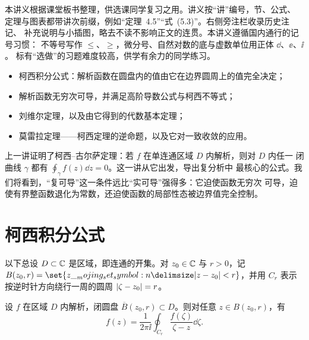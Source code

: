 \documentclass{mojing-notes}
\institute{示例大学数学科学学院}
\begin{document}
\maketitle
\tableofcontents

\vspace{2\baselineskip}
\par\smallskip
\noindent 本讲义根据课堂板书整理，供选课同学复习之用。讲义按“讲”编号，节、公式、
定理与图表都带讲次前缀，例如“定理~4.5”“式~(5.3)”。右侧旁注栏收录历史注记、
补充说明与小插图，略去不读不影响正文的连贯。本讲义遵循国内通行的记号习惯：
不等号写作 $\le$、$\ge$，微分号、自然对数的底与虚数单位用正体 $\dd$、$\ee$、$\ii$。
标有“选做”的习题难度较高，供学有余力的同学练习。


\begin{keypoints}
\begin{itemize}
  \item 柯西积分公式：解析函数在圆盘内的值由它在边界圆周上的值完全决定；
  \item 解析函数无穷次可导，并满足高阶导数公式与柯西不等式；
  \item 刘维尔定理，以及由它得到的代数基本定理；
  \item 莫雷拉定理——柯西定理的逆命题，以及它对一致收敛的应用。
\end{itemize}
\end{keypoints}

上一讲证明了柯西--古尔萨定理：若 $f$ 在单连通区域 $D$ 内解析，则对 $D$ 内任一
闭曲线 $\gamma$ 都有 $\oint_\gamma f(z)\dd z=0$。这一讲从它出发，导出复分析中
最核心的公式。我们将看到，“复可导”这一条件远比“实可导”强得多：它迫使函数无穷次
可导，迫使有界整函数退化为常数，还迫使函数的局部性态被边界值完全控制。

\section{柯西积分公式}

以下总设 $D\subset\mathbb{C}$ 是区域，即连通的开集。对 $z_0\in\mathbb{C}$ 与 $r>0$，记
$B(z_0,r)=\set{z\given\abs{z-z_0}<r}$，并用 $C_r$ 表示按逆时针方向绕行一周的圆周
$\lvert\zeta-z_0\rvert=r$。

\begin{theorem}[柯西积分公式]\label{thm:cauchy-formula}
设 $f$ 在区域 $D$ 内解析，闭圆盘 $\overline{B}(z_0,r)\subset D$。则对任意
$z\in B(z_0,r)$，有
\begin{equation}\label{eq:cauchy-formula}
  f(z)=\frac{1}{2\pi\ii}\oint_{C_r}\frac{f(\zeta)}{\zeta-z}\dd\zeta .
\end{equation}
\end{theorem}
\end{document}
